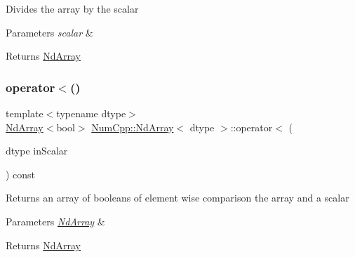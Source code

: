 Divides the array by the scalar


\begin{DoxyParams}{Parameters}
{\em scalar} & \\
\hline
\end{DoxyParams}
\begin{DoxyReturn}{Returns}
\mbox{\hyperlink{class_num_cpp_1_1_nd_array}{Nd\+Array}} 
\end{DoxyReturn}
\mbox{\label{class_num_cpp_1_1_nd_array_a9b33a88659604b840cab4daa6d467b4b}} 
\subsubsection{\texorpdfstring{operator$<$()}{operator<()}\hspace{0.1cm}{\footnotesize\ttfamily [1/2]}}
{\footnotesize\ttfamily template$<$typename dtype$>$ \\
\mbox{\hyperlink{class_num_cpp_1_1_nd_array}{Nd\+Array}}$<$bool$>$ \mbox{\hyperlink{class_num_cpp_1_1_nd_array}{Num\+Cpp\+::\+Nd\+Array}}$<$ dtype $>$\+::operator$<$ (\begin{DoxyParamCaption}\item[{dtype}]{in\+Scalar }\end{DoxyParamCaption}) const\hspace{0.3cm}{\ttfamily [inline]}}

Returns an array of booleans of element wise comparison the array and a scalar


\begin{DoxyParams}{Parameters}
{\em \mbox{\hyperlink{class_num_cpp_1_1_nd_array}{Nd\+Array}}} & \\
\hline
\end{DoxyParams}
\begin{DoxyReturn}{Returns}
\mbox{\hyperlink{class_num_cpp_1_1_nd_array}{Nd\+Array}} 
\end{DoxyReturn}
\mbox{\label{class_num_cpp_1_1_nd_array_aacb96cf29278cced020132cd8e516a59}} 
